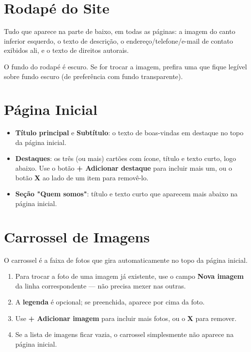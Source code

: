 \documentclass[11pt,a4paper]{article}
\begin{document}
\section{Rodapé do Site}

Tudo que aparece na parte de baixo, em todas as páginas: a imagem do canto inferior esquerdo, o
texto de descrição, o endereço/telefone/e-mail de contato exibidos ali, e o texto de direitos
autorais.

\begin{dica}
O fundo do rodapé é escuro. Se for trocar a imagem, prefira uma que fique legível sobre fundo
escuro (de preferência com fundo transparente).
\end{dica}

\section{Página Inicial}

\begin{itemize}[leftmargin=2em]
    \item \textbf{Título principal} e \textbf{Subtítulo}: o texto de boas-vindas em destaque no
          topo da página inicial.
    \item \textbf{Destaques}: os três (ou mais) cartões com ícone, título e texto curto, logo
          abaixo. Use o botão \textbf{+ Adicionar destaque} para incluir mais um, ou o botão
          \textbf{X} ao lado de um item para removê-lo.
    \item \textbf{Seção "Quem somos"}: título e texto curto que aparecem mais abaixo na página
          inicial.
\end{itemize}

\section{Carrossel de Imagens}

O carrossel é a faixa de fotos que gira automaticamente no topo da página inicial.

\begin{enumerate}[leftmargin=2em]
    \item Para trocar a foto de uma imagem já existente, use o campo \textbf{Nova imagem} da
          linha correspondente — não precisa mexer nas outras.
    \item A \textbf{legenda} é opcional; se preenchida, aparece por cima da foto.
    \item Use \textbf{+ Adicionar imagem} para incluir mais fotos, ou o \textbf{X} para remover.
    \item Se a lista de imagens ficar vazia, o carrossel simplesmente não aparece na página
          inicial.
\end{enumerate}
\end{document}
